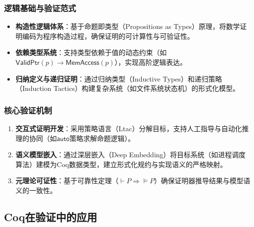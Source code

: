 \subsubsection{逻辑基础与验证范式}
\begin{itemize}
    \item \textbf{构造性逻辑体系}：基于命题即类型（Propositions as Types）原理，将数学证明编码为程序构造过程，确保证明的可计算性与可验证性。
    \item \textbf{依赖类型系统}：支持类型依赖于值的动态约束（如$\mathsf{ValidPtr}(p) \rightarrow \mathsf{MemAccess}(p)$），实现高阶逻辑表达。
    \item \textbf{归纳定义与递归证明}：通过归纳类型（Inductive Types）和递归策略（Induction Tactics）构建复杂系统（如文件系统状态机）的形式化模型。
\end{itemize}

\subsubsection{核心验证机制}
\begin{enumerate}
    \item \textbf{交互式证明开发}：采用策略语言（Ltac）分解目标，支持人工指导与自动化推理的协同（如$\mathsf{auto}$策略求解命题逻辑）。
    \item \textbf{语义模型嵌入}：通过深层嵌入（Deep Embedding）将目标系统（如进程调度算法）建模为Coq数据类型，建立形式化规约与实现语义的严格映射。
    \item \textbf{元理论可证性}：基于可靠性定理（$\vdash P \Rightarrow \models P$）确保证明器推导结果与模型语义的一致性。
\end{enumerate}

\subsection{Coq在验证中的应用}
\label{subsec:coq-applications}

